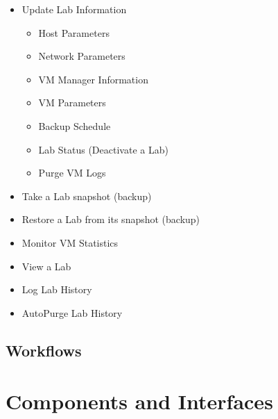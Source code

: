 \documentclass[11pt]{article}
\begin{document}
\begin{itemize}
\item Update Lab Information\\
\label{sec-3.4.7}

\begin{itemize}
\item Host Parameters
\item Network Parameters
\item VM Manager Information
\item VM Parameters
\item Backup Schedule
\item Lab Status (Deactivate a Lab)
\item Purge VM Logs
\end{itemize}

\item Take a Lab snapshot (backup)\\
\label{sec-3.4.8}


\item Restore a Lab from its snapshot (backup)\\
\label{sec-3.4.9}


\item Monitor VM Statistics\\
\label{sec-3.4.10}


\item View a Lab\\
\label{sec-3.4.11}


\item Log Lab History\\
\label{sec-3.4.12}


\item AutoPurge Lab History\\
\label{sec-3.4.13}


     
\end{itemize} %
\subsection{Workflows}
\label{sec-3.4}

\section{Components and Interfaces}
\label{sec-4}
\end{document}
